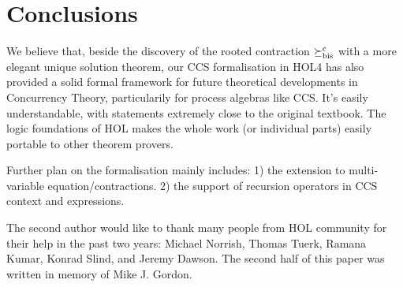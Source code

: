 


\section{Conclusions}
\label{s:concl}

We believe that, beside the discovery of the rooted contraction $\mathrel{\succeq^{\rm{c}}_{\rm{bis}}}$
with a more elegant unique solution theorem,
our CCS formalisation in HOL4 has also
provided a solid formal framework for future theoretical developments in
Concurrency Theory, particularily for process algebras like CCS. It's
easily understandable, with statements extremely close to the original
textbook. The logic foundations of HOL makes the whole work (or individual
parts) easily portable to other theorem provers.

Further plan on the formalisation mainly includes: 1) the extension to
multi-variable equation/contractions. 2) the support of recursion operators in
CCS context and expressions.

The second author would like to thank many people from HOL community
for their help in the past two years: Michael Norrish, Thomas Tuerk, 
Ramana Kumar, Konrad Slind, and Jeremy Dawson. The second half of this
paper was written in memory of  Mike J. Gordon.
